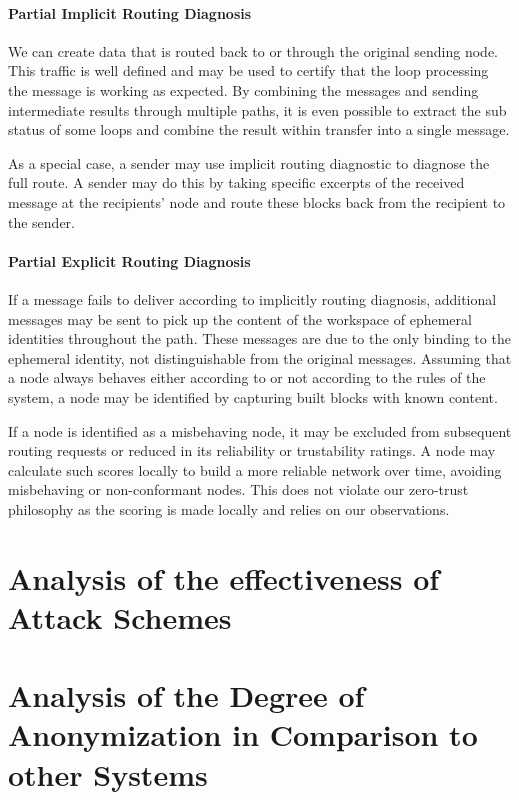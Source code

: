 \subsubsection{Partial Implicit Routing Diagnosis}
We can create data that is routed back to or through the original sending node. This traffic is well defined and may be used to certify that the loop processing the message is working as expected. By combining the messages and sending intermediate results through multiple paths, it is even possible to extract the sub status of some loops and combine the result within transfer into a single message.

As a special case, a sender may use implicit routing diagnostic to diagnose the full route. A sender may do this by taking specific excerpts of the received message at the recipients' node and route these blocks back from the recipient to the sender. 

\subsubsection{Partial Explicit Routing Diagnosis}
If a message fails to deliver according to implicitly routing diagnosis, additional messages may be sent to pick up the content of the workspace of ephemeral identities throughout the path. These messages are due to the only binding to the ephemeral identity, not distinguishable from the original messages. Assuming that a node always behaves either according to or not according to the rules of the system, a node may be identified by capturing built blocks with known content.

If a node is identified as a misbehaving node, it may be excluded from subsequent routing requests or reduced in its reliability or trustability ratings. A node may calculate such scores locally to build a more reliable network over time, avoiding misbehaving or non-conformant nodes. This does not violate our zero-trust philosophy as the scoring is made locally and relies on our observations.


\chapter{Analysis of the effectiveness of Attack Schemes}

\chapter{Analysis of the Degree of Anonymization in Comparison to other Systems}

